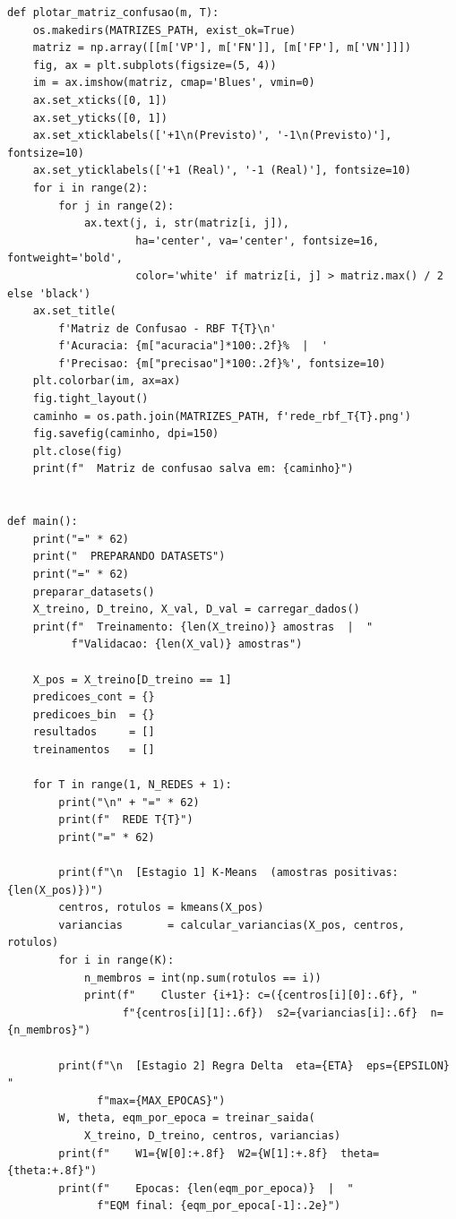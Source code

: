 \documentclass[article, 12pt, oneside, a4paper, section = TITLE, brazil]{abntex2}
\begin{document}
\begin{lstlisting}
def plotar_matriz_confusao(m, T):
    os.makedirs(MATRIZES_PATH, exist_ok=True)
    matriz = np.array([[m['VP'], m['FN']], [m['FP'], m['VN']]])
    fig, ax = plt.subplots(figsize=(5, 4))
    im = ax.imshow(matriz, cmap='Blues', vmin=0)
    ax.set_xticks([0, 1])
    ax.set_yticks([0, 1])
    ax.set_xticklabels(['+1\n(Previsto)', '-1\n(Previsto)'], fontsize=10)
    ax.set_yticklabels(['+1 (Real)', '-1 (Real)'], fontsize=10)
    for i in range(2):
        for j in range(2):
            ax.text(j, i, str(matriz[i, j]),
                    ha='center', va='center', fontsize=16, fontweight='bold',
                    color='white' if matriz[i, j] > matriz.max() / 2 else 'black')
    ax.set_title(
        f'Matriz de Confusao - RBF T{T}\n'
        f'Acuracia: {m["acuracia"]*100:.2f}%  |  '
        f'Precisao: {m["precisao"]*100:.2f}%', fontsize=10)
    plt.colorbar(im, ax=ax)
    fig.tight_layout()
    caminho = os.path.join(MATRIZES_PATH, f'rede_rbf_T{T}.png')
    fig.savefig(caminho, dpi=150)
    plt.close(fig)
    print(f"  Matriz de confusao salva em: {caminho}")


def main():
    print("=" * 62)
    print("  PREPARANDO DATASETS")
    print("=" * 62)
    preparar_datasets()
    X_treino, D_treino, X_val, D_val = carregar_dados()
    print(f"  Treinamento: {len(X_treino)} amostras  |  "
          f"Validacao: {len(X_val)} amostras")

    X_pos = X_treino[D_treino == 1]
    predicoes_cont = {}
    predicoes_bin  = {}
    resultados     = []
    treinamentos   = []

    for T in range(1, N_REDES + 1):
        print("\n" + "=" * 62)
        print(f"  REDE T{T}")
        print("=" * 62)

        print(f"\n  [Estagio 1] K-Means  (amostras positivas: {len(X_pos)})")
        centros, rotulos = kmeans(X_pos)
        variancias       = calcular_variancias(X_pos, centros, rotulos)
        for i in range(K):
            n_membros = int(np.sum(rotulos == i))
            print(f"    Cluster {i+1}: c=({centros[i][0]:.6f}, "
                  f"{centros[i][1]:.6f})  s2={variancias[i]:.6f}  n={n_membros}")

        print(f"\n  [Estagio 2] Regra Delta  eta={ETA}  eps={EPSILON}  "
              f"max={MAX_EPOCAS}")
        W, theta, eqm_por_epoca = treinar_saida(
            X_treino, D_treino, centros, variancias)
        print(f"    W1={W[0]:+.8f}  W2={W[1]:+.8f}  theta={theta:+.8f}")
        print(f"    Epocas: {len(eqm_por_epoca)}  |  "
              f"EQM final: {eqm_por_epoca[-1]:.2e}")


\end{lstlisting}
\end{document}
